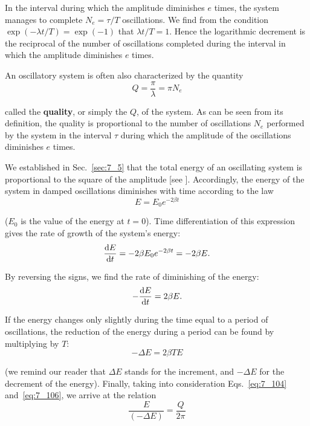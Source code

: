 \noindent
In the interval during which the amplitude diminishes $e$ times, the system manages to complete $N_e=\tau/T$ oscillations. We find from the condition $\exp(-\lambda t/T)=\exp(-1)$ that $\lambda t/T=1$. Hence the logarithmic decrement is the reciprocal of the number of oscillations completed during the interval in which the amplitude diminishes $e$ times.

An oscillatory system is often also characterized by the quantity
\begin{equation}\label{eq:7_106}
	Q = \frac{\pi}{\lambda} = \pi N_e
\end{equation}

\noindent
called the \textbf{quality}, or simply the $Q$, of the system. As can be seen from its definition, the quality is proportional to the number of oscillations $N_e$ performed by the system in the interval $\tau$ during which the amplitude of the oscillations diminishes $e$ times.

We established in Sec.~\ref{sec:7_5} that the total energy of an oscillating system is proportional to the square of the amplitude [see ]. Accordingly, the energy of the system in damped oscillations diminishes with time according to the law
\begin{equation}\label{eq:7_107}
	E = E_0 e^{-2\beta t}
\end{equation}

\noindent
($E_0$ is the value of the energy at $t=0$). Time differentiation of this expression gives the rate of growth of the system's energy:
\begin{equation*}
	\frac{\mathrm{d} E}{\mathrm{d} t} = -2\beta E_0 e^{-2\beta t} = -2\beta E.
\end{equation*}

\noindent
By reversing the signs, we find the rate of diminishing of the energy:
\begin{equation}\label{eq:7_108}
	-\frac{\mathrm{d} E}{\mathrm{d} t} = 2\beta E.
\end{equation}

\noindent
If the energy changes only slightly during the time equal to a period of oscillations, the reduction of the energy during a period can be found by multiplying  by $T$:
\begin{equation*}
	-\Delta E = 2\beta T E
\end{equation*}

\noindent
(we remind our reader that $\Delta E$ stands for the increment, and $-\Delta E$ for the decrement of the energy). Finally, taking into consideration Eqs.~\eqref{eq:7_104} and~\eqref{eq:7_106}, we arrive at the relation
\begin{equation}\label{eq:7_109}
	\frac{E}{(-\Delta E)} = \frac{Q}{2\pi}
\end{equation}

